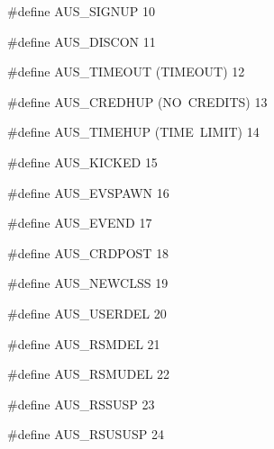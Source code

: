 \documentclass{article}
\begin{document}
\begin{cxxmacro}
{\#define}
        {AUS\_SIGNUP}
        {}
        {}
        {10}
\end{cxxmacro}
\begin{cxxmacro}
{\#define}
        {AUS\_DISCON}
        {}
        {}
        {11}
\end{cxxmacro}
\begin{cxxmacro}
{\#define}
        {AUS\_TIMEOUT}
        {(TIMEOUT)}
        {}
        {12}
\end{cxxmacro}
\begin{cxxmacro}
{\#define}
        {AUS\_CREDHUP}
        {(NO\ CREDITS)}
        {}
        {13}
\end{cxxmacro}
\begin{cxxmacro}
{\#define}
        {AUS\_TIMEHUP}
        {(TIME\ LIMIT)}
        {}
        {14}
\end{cxxmacro}
\begin{cxxmacro}
{\#define}
        {AUS\_KICKED}
        {}
        {}
        {15}
\end{cxxmacro}
\begin{cxxmacro}
{\#define}
        {AUS\_EVSPAWN}
        {}
        {}
        {16}
\end{cxxmacro}
\begin{cxxmacro}
{\#define}
        {AUS\_EVEND}
        {}
        {}
        {17}
\end{cxxmacro}
\begin{cxxmacro}
{\#define}
        {AUS\_CRDPOST}
        {}
        {}
        {18}
\end{cxxmacro}
\begin{cxxmacro}
{\#define}
        {AUS\_NEWCLSS}
        {}
        {}
        {19}
\end{cxxmacro}
\begin{cxxmacro}
{\#define}
        {AUS\_USERDEL}
        {}
        {}
        {20}
\end{cxxmacro}
\begin{cxxmacro}
{\#define}
        {AUS\_RSMDEL}
        {}
        {}
        {21}
\end{cxxmacro}
\begin{cxxmacro}
{\#define}
        {AUS\_RSMUDEL}
        {}
        {}
        {22}
\end{cxxmacro}
\begin{cxxmacro}
{\#define}
        {AUS\_RSSUSP}
        {}
        {}
        {23}
\end{cxxmacro}
\begin{cxxmacro}
{\#define}
        {AUS\_RSUSUSP}
        {}
        {}
        {24}
\end{cxxmacro}
\end{document}
